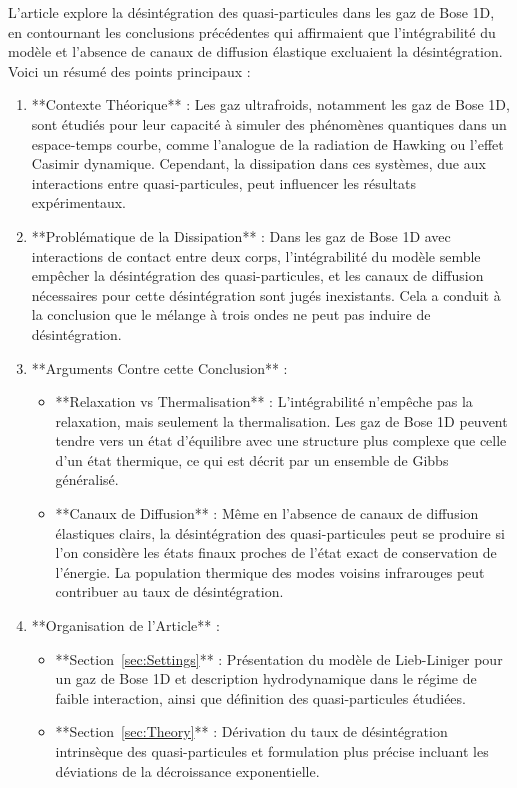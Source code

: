 \documentclass[aps,prd,notitlepage,amsfonts,amssymb,amsmath,nofootinbib,superscriptaddress,longbibliography]{revtex4-2}
\newcommand{\resumefr}[1]{\textcolor{resumecolor}{#1}}
\begin{document}
\resumefr{
L'article explore la désintégration des quasi-particules dans les gaz de Bose 1D, en contournant les conclusions précédentes qui affirmaient que l'intégrabilité du modèle et l'absence de canaux de diffusion élastique excluaient la désintégration. Voici un résumé des points principaux :
\begin{enumerate}
	\item **Contexte Théorique** : Les gaz ultrafroids, notamment les gaz de Bose 1D, sont étudiés pour leur capacité à simuler des phénomènes quantiques dans un espace-temps courbe, comme l'analogue de la radiation de Hawking ou l'effet Casimir dynamique. Cependant, la dissipation dans ces systèmes, due aux interactions entre quasi-particules, peut influencer les résultats expérimentaux.
	\item **Problématique de la Dissipation** : Dans les gaz de Bose 1D avec interactions de contact entre deux corps, l'intégrabilité du modèle semble empêcher la désintégration des quasi-particules, et les canaux de diffusion nécessaires pour cette désintégration sont jugés inexistants. Cela a conduit à la conclusion que le mélange à trois ondes ne peut pas induire de désintégration.
	\item **Arguments Contre cette Conclusion** :
		\begin{itemize}
			\item **Relaxation vs Thermalisation** : L'intégrabilité n'empêche pas la relaxation, mais seulement la thermalisation. Les gaz de Bose 1D peuvent tendre vers un état d'équilibre avec une structure plus complexe que celle d'un état thermique, ce qui est décrit par un ensemble de Gibbs généralisé.
			\item **Canaux de Diffusion** : Même en l'absence de canaux de diffusion élastiques clairs, la désintégration des quasi-particules peut se produire si l'on considère les états finaux proches de l'état exact de conservation de l'énergie. La population thermique des modes voisins infrarouges peut contribuer au taux de désintégration.
		\end{itemize}
	\item **Organisation de l'Article** :
		\begin{itemize}
			\item **Section~\ref{sec:Settings}** : Présentation du modèle de Lieb-Liniger pour un gaz de Bose 1D et description hydrodynamique dans le régime de faible interaction, ainsi que définition des quasi-particules étudiées.
			\item **Section~\ref{sec:Theory}** : Dérivation du taux de désintégration intrinsèque des quasi-particules et formulation plus précise incluant les déviations de la décroissance exponentielle.

\end{itemize}
\end{enumerate}}
\end{document}
